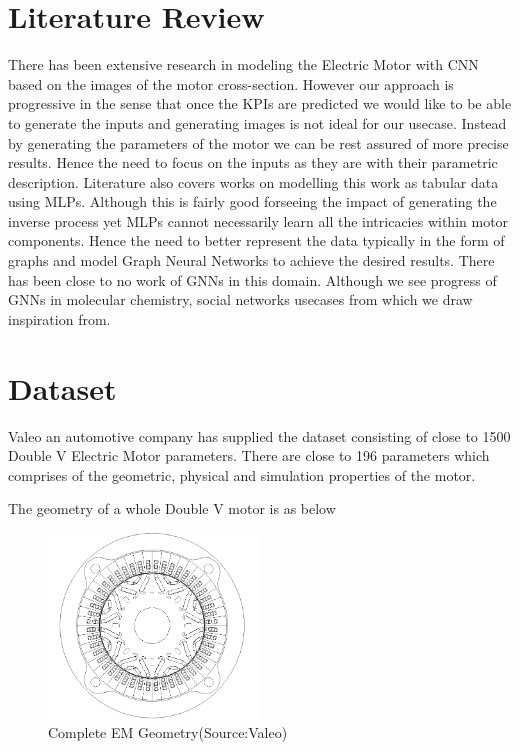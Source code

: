 \documentclass{report} %
\begin{document}
\chapter*{Literature Review} 
There has been extensive research in modeling the Electric Motor with CNN based on the images of the motor cross-section. 
However our approach is progressive in the sense that once the KPIs are predicted we would like to be able to generate the inputs and generating images is not ideal for our usecase.
Instead by generating the parameters of the motor we can be rest assured of more precise results. Hence the need to focus on the inputs as they are with their parametric description.
Literature also covers works on modelling this work as tabular data using MLPs. Although this is fairly good forseeing the impact of generating the inverse process yet MLPs cannot necessarily learn all the intricacies within motor components.
Hence the need to better represent the data typically in the form of graphs and model Graph Neural Networks to achieve the desired results. There has been close to no work of GNNs in this domain.
Although we see progress of GNNs in molecular chemistry, social networks usecases from which we draw inspiration from.

\newpage 

\chapter*{Dataset} 
Valeo an automotive company has supplied the dataset consisting of close to 1500 Double V Electric Motor parameters. 
There are close to 196 parameters which comprises of the geometric, physical and simulation properties of the motor.

The geometry of a whole Double V motor is as below

\begin{figure}[h]
    \centering
    \includegraphics[width=0.5\textwidth]{./ReportImages/FullMotorv2.png} 
    \caption{Complete EM Geometry(Source:Valeo)}
    \label{fig:Full Motor}
\end{figure}
\end{document}
